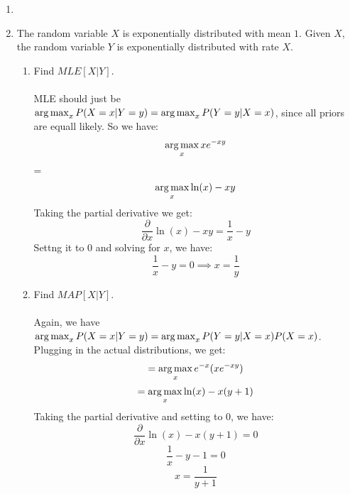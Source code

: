\begin{enumerate}
  \item 
  \item The random variable $X$ is exponentially distributed with mean $1$. Given $X$, the random variable $Y$ is exponentially distributed with rate $X$.
    \begin{enumerate}
      \item Find $MLE[X|Y]$.\\\\

        MLE should just be $\operatorname*{arg\,max}_x P(X=x|Y=y) = \operatorname*{arg\,max}_x P(Y=y|X=x)$, since all priors are equall likely. So we have:
        $$\operatorname*{arg\,max}_x xe^{-xy}$$
        =$$\operatorname*{arg\,max}_x \ln(x) - xy$$
        Taking the partial derivative we get:
        $$\frac{\partial}{\partial x} \ln(x) - xy = \frac{1}{x} - y$$
        Settng it to $0$ and solving for $x$, we have:
        $$\frac{1}{x} - y = 0 \implies x = \frac{1}{y}$$
      \item Find $MAP[X|Y]$.\\\\

        Again, we have $\operatorname*{arg\,max}_x P(X=x|Y=y) = \operatorname*{arg\,max}_x P(Y=y|X=x)P(X=x)$. Plugging in the actual distributions, we get:
        $$=\operatorname*{arg\,max}_x e^{-x}(xe^{-xy})$$
        $$=\operatorname*{arg\,max}_x \ln(x) - x(y+1)$$
        Taking the partial derivative and setting to $0$, we have:
        $$\frac{\partial}{\partial x} \ln(x) - x(y+1) = 0$$
        $$\frac{1}{x} - y - 1 = 0$$
        $$x = \frac{1}{y+1}$$
    \end{enumerate}


\end{enumerate}
